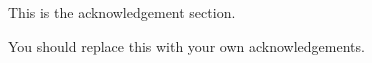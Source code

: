 

This is the acknowledgement section.
\par
You should replace this with your own acknowledgements.

